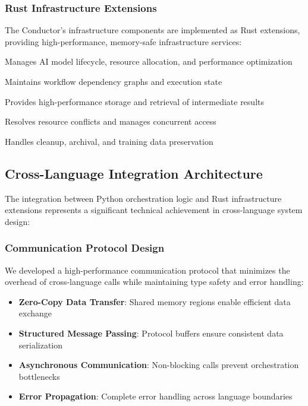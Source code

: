 \subsubsection{Rust Infrastructure Extensions}

The Conductor's infrastructure components are implemented as Rust extensions, providing high-performance, memory-safe infrastructure services:

\begin{description}[leftmargin=3cm,labelwidth=2.5cm]
    \item[\textbf{Pool Manager}] Manages AI model lifecycle, resource allocation, and performance optimization
    \item[\textbf{DAG Tracker}] Maintains workflow dependency graphs and execution state
    \item[\textbf{Artifact Store}] Provides high-performance storage and retrieval of intermediate results
    \item[\textbf{Arbitration Engine}] Resolves resource conflicts and manages concurrent access
    \item[\textbf{Stale Manager}] Handles cleanup, archival, and training data preservation
\end{description}

\subsection{Cross-Language Integration Architecture}

The integration between Python orchestration logic and Rust infrastructure extensions represents a significant technical achievement in cross-language system design:

\subsubsection{Communication Protocol Design}

We developed a high-performance communication protocol that minimizes the overhead of cross-language calls while maintaining type safety and error handling:

\begin{itemize}
    \item \textbf{Zero-Copy Data Transfer}: Shared memory regions enable efficient data exchange
    \item \textbf{Structured Message Passing}: Protocol buffers ensure consistent data serialization
    \item \textbf{Asynchronous Communication}: Non-blocking calls prevent orchestration bottlenecks
    \item \textbf{Error Propagation}: Complete error handling across language boundaries
\end{itemize}

